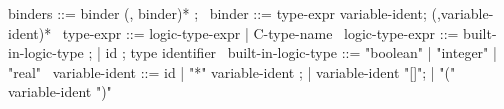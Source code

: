 \begin{syntax}
  binders ::= binder (, binder)* ;
  \
  binder ::= type-expr variable-ident;
             (,variable-ident)*
  \
  type-expr ::= logic-type-expr | C-type-name
  \
  logic-type-expr ::= built-in-logic-type ;
  | id ; type identifier
  \
  built-in-logic-type ::= "boolean" | "integer" | { "real" }
  \
  variable-ident ::= id
  | "*" variable-ident ;
  | variable-ident "[]";
  | "(" variable-ident ")"
\end{syntax}
